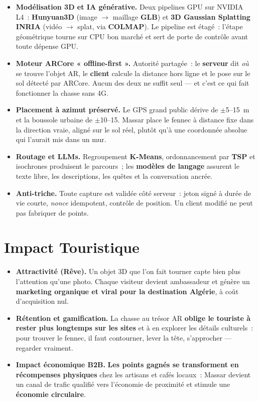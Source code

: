 \documentclass[11pt,a4paper]{article}
\newcommand{\hrulethin}{\vspace{-0.7em}\par\noindent{\color{accent}\rule{\linewidth}{0.5pt}}\par\vspace{-0.45em}}
\begin{document}
\begin{itemize}
  \item \textbf{Modélisation 3D et IA générative.} Deux pipelines GPU sur NVIDIA L4~: \textbf{Hunyuan3D} (image $\rightarrow$ maillage \textbf{GLB}) et \textbf{3D Gaussian Splatting INRIA} (vidéo $\rightarrow$ splat, via \textbf{COLMAP}). Le pipeline est étagé~: l'étape géométrique tourne sur CPU bon marché et sert de porte de contrôle avant toute dépense GPU.
  \item \textbf{Moteur ARCore « offline-first ».} Autorité partagée~: le \textbf{serveur} dit \emph{où} se trouve l'objet AR, le \textbf{client} calcule la distance hors ligne et le pose sur le sol détecté par ARCore. Aucun des deux ne suffit seul — et c'est ce qui fait fonctionner la chasse sans 4G.
  \item \textbf{Placement à azimut préservé.} Le GPS grand public dérive de $\pm$5–15~m et la boussole urbaine de $\pm$10–15\textdegree{}. Massar place le fennec à distance fixe dans la direction vraie, aligné sur le sol réel, plutôt qu'à une coordonnée absolue qui l'aurait mis dans un mur.
  \item \textbf{Routage et LLMs.} Regroupement \textbf{K-Means}, ordonnancement par \textbf{TSP} et isochrones produisent le parcours~; les \textbf{modèles de langage} assurent le texte libre, les descriptions, les quêtes et la conversation ancrée.
  \item \textbf{Anti-triche.} Toute capture est validée côté serveur~: jeton signé à durée de vie courte, \emph{nonce} idempotent, contrôle de position. Un client modifié ne peut pas fabriquer de points.
\end{itemize}

\section{Impact Touristique}\hrulethin

\begin{itemize}
  \item \textbf{Attractivité (Rêve).} Un objet 3D que l'on fait tourner capte bien plus l'attention qu'une photo. Chaque visiteur devient ambassadeur et génère un \textbf{marketing organique et viral pour la destination Algérie}, à coût d'acquisition nul.
  \item \textbf{Rétention et gamification.} La chasse au trésor AR \textbf{oblige le touriste à rester plus longtemps sur les sites} et à en explorer les détails culturels~: pour trouver le fennec, il faut contourner, lever la tête, s'approcher — regarder vraiment.
  \item \textbf{Impact économique B2B.} \textbf{Les points gagnés se transforment en récompenses physiques} chez les artisans et cafés locaux~: Massar devient un canal de trafic qualifié vers l'économie de proximité et stimule une \textbf{économie circulaire}.
\end{itemize}
\end{document}

